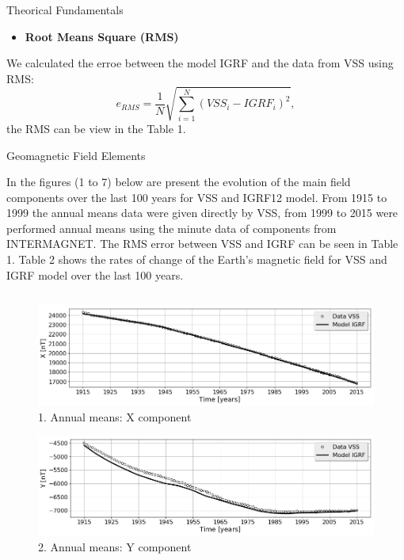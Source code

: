 \documentclass[final,t]{beamer}
\begin{document}
\begin{columns}[t]
\begin{column}{.47\linewidth}
\begin{block}{Theorical Fundamentals}
		\begin{itemize}
			\item 	\textbf{Root Means Square (RMS)}
		\end{itemize}
		We calculated the erroe between the model IGRF and the data from VSS using RMS:
		\[e_{RMS}=\frac{1}{N} \sqrt{\sum\limits_{i=1}^{N}(VSS_{i}-IGRF_{i})^{2}}, 
		\]
		the RMS can be view in the Table 1.
		
		
	\end{block}	



\begin{block}{Geomagnetic Field Elements}
	\justifying
	
In the figures (1 to 7) below are present the evolution of the main field components over the last 100 years for VSS and IGRF12 model. From 1915 to 1999 the  annual means data  were given directly by VSS, from 1999 to 2015 were performed annual means using the minute data of components from INTERMAGNET. The RMS error between VSS and IGRF can be seen in Table 1. Table 2 shows the rates of change of the Earth's magnetic field  for VSS and IGRF model over the last 100 years.
\\
\end{block}

\begin{columns}

\begin{column}{.49\linewidth}

\begin{block}

\begin{figure}
\centering
\includegraphics[scale=0.6]{"figs_ed/X mean all_V3"}
\caption{1. Annual means: X component}
\label{fig:Xmeanall_V3}
\end{figure}
	
	
\begin{figure}
\centering
\includegraphics[scale=0.6]{"figs_ed/Y mean all_v3"}
\caption{2. Annual means: Y component}
\label{fig:Ymeanall_v3}
\end{figure}


\end{block}
\end{column}
\end{columns}
\end{column}
\end{columns}
\end{document}

